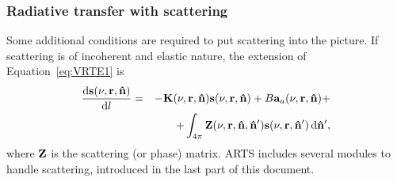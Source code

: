 \subsubsection{Radiative transfer with scattering}
%
Some additional conditions are required to put scattering into the picture. If
scattering is of incoherent and elastic nature, the extension of 
Equation~\ref{eq:VRTE1} is
\begin{eqnarray}
  \label{eq:VRTE2}
  \frac {\mathrm{d}{\bf s}(\nu,{\bf r},{\bf \hat{n}})}{\mathrm{d} l} &=&
    -{\bf K}(\nu,{\bf r},{\bf \hat{n}}) {\bf s}(\nu,{\bf r},{\bf \hat{n}}) +
     B{\bf a}_{a}(\nu,{\bf r},{\bf \hat{n}}) + \\ \nonumber
    &&+ \int_{4\pi} {\bf Z}(\nu,{\bf r},{\bf \hat{n}},{\bf \hat{n}}')
    {\bf s}(\nu,{\bf r},{\bf \hat{n}}')\,\mathrm{d}{\bf \hat{n}}' ,
\end{eqnarray}
where ${\bf Z}$ is the scattering (or phase) matrix.  ARTS includes several
modules to handle scattering, introduced in the last part of this document.\\





